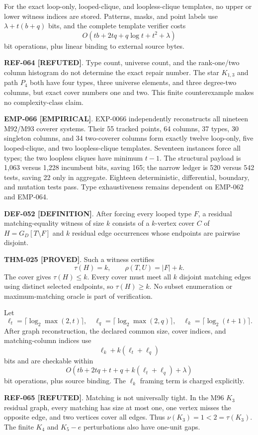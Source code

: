 \documentclass[11pt]{article}
\newcommand{\claimstatus}[2]{\textbf{#1 [#2]}}
\begin{document}
For the exact loop-only, looped-clique, and loopless-clique templates, no
upper or lower witness indices are stored. Patterns, masks, and point labels
use \(\lambda+t(b+q)\) bits, and the complete template verifier costs
\[
 O(tb+2tq+q\log t+t^2+\lambda)
\]
bit operations, plus linear binding to external source bytes.

\claimstatus{REF-064}{REFUTED}. Type count, universe count, and the
rank-one/two column histogram do not determine the exact repair number. The
star \(K_{1,3}\) and path \(P_4\) both have four types, three universe
elements, and three degree-two columns, but exact cover numbers one and two.
This finite counterexample makes no complexity-class claim.

\claimstatus{EMP-066}{EMPIRICAL}. EXP-0066 independently reconstructs all
nineteen M92/M93 coverer systems. Their 55 tracked points, 64 columns, 37
types, 30 singleton columns, and 34 two-coverer columns form exactly twelve
loop-only, five looped-clique, and two loopless-clique templates. Seventeen
instances force all types; the two loopless cliques have minimum \(t-1\).
The structural payload is 1,063 versus 1,228 incumbent bits, saving 165; the
narrow ledger is 520 versus 542 tests, saving 22 only in aggregate. Eighteen
deterministic, differential, boundary, and mutation tests pass. Type
exhaustiveness remains dependent on EMP-062 and EMP-064.

\claimstatus{DEF-052}{DEFINITION}. After forcing every looped type \(F\), a
residual matching-equality witness of size \(k\) consists of a \(k\)-vertex
cover \(C\) of \(H=G_D[T\setminus F]\) and \(k\) residual edge occurrences
whose endpoints are pairwise disjoint.

\claimstatus{THM-025}{PROVED}. Such a witness certifies
\[
 \tau(H)=k,\qquad \rho(T,U)=|F|+k.
\]
The cover gives \(\tau(H)\le k\). Every cover must meet all \(k\) disjoint
matching edges using distinct selected endpoints, so \(\tau(H)\ge k\).
No subset enumeration or maximum-matching oracle is part of verification.

Let
\[
 \ell_t=\lceil\log_2\max(2,t)\rceil,\quad
 \ell_q=\lceil\log_2\max(2,q)\rceil,\quad
 \ell_k=\lceil\log_2(t+1)\rceil.
\]
After graph reconstruction, the declared common size, cover indices, and
matching-column indices use
\[
 \ell_k+k(\ell_t+\ell_q)
\]
bits and are checkable within
\[
 O(tb+2tq+t+q+k(\ell_t+\ell_q)+\lambda)
\]
bit operations, plus source binding. The \(\ell_k\) framing term is charged
explicitly.

\claimstatus{REF-065}{REFUTED}. Matching is not universally tight. In the
M96 \(K_3\) residual graph, every matching has size at most one, one vertex
misses the opposite edge, and two vertices cover all edges. Thus
\(\nu(K_3)=1<2=\tau(K_3)\). The finite \(K_4\) and \(K_5-e\) perturbations
also have one-unit gaps.
\end{document}
